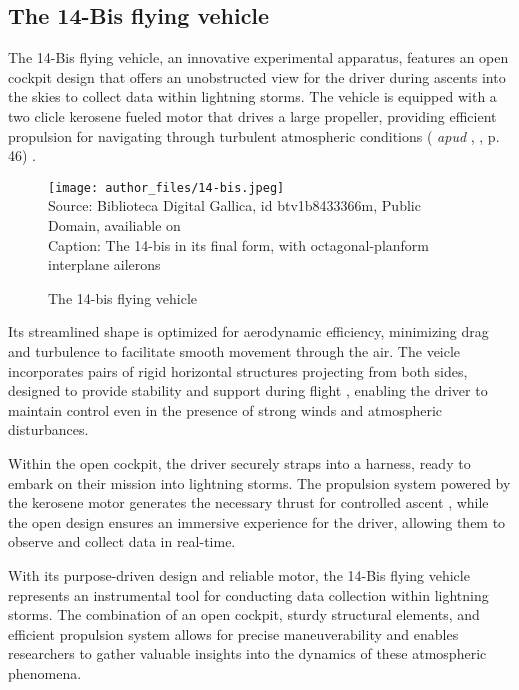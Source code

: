 \documentclass[english]{cenarticle} %
\newcommand{\citeapud}[3]{
  (\citeauthor{#1} {\it apud} \citeauthor{#2}, \citeyear{#2}, p. #3)
}
\begin{document}
\subsection{The 14-Bis flying vehicle}
The 14-Bis flying vehicle, an innovative experimental apparatus, features an open cockpit design that offers an unobstructed view for the driver during ascents into the skies to collect data within lightning storms. The vehicle is equipped with a two clicle kerosene fueled motor \citep{Torrens1992} that drives a large propeller, providing efficient propulsion for navigating through turbulent atmospheric conditions \citeapud{Pimenta1987}{Torrens1992}{46}.\par
%
\begin{figure}[!h]
  \caption{The 14-bis flying vehicle}
  \texttt{[image: author\_files/14-bis.jpeg]}\\
  {\footnotesize
    Source: Biblioteca Digital Gallica, id btv1b8433366m, Public Domain, availiable on \citep{Beau1907}\\
    Caption: The 14-bis in its final form, with octagonal-planform interplane ailerons
  }
  \label{fig:flying_veicle}
\end{figure}
%
Its streamlined shape is optimized for aerodynamic efficiency, minimizing drag and turbulence to facilitate smooth movement through the air. The veicle incorporates pairs of rigid horizontal structures projecting from both sides, designed to provide stability and support during flight \citep{Wipo}, enabling the driver to maintain control even in the presence of strong winds and atmospheric disturbances.\par
%
Within the open cockpit, the driver securely straps into a harness, ready to embark on their mission into lightning storms. The propulsion system powered by the kerosene motor generates the necessary thrust for controlled ascent \citep{Torrens1992}, while the open design ensures an immersive experience for the driver, allowing them to observe and collect data in real-time.\par
%
With its purpose-driven design and reliable motor, the 14-Bis flying vehicle represents an instrumental tool for conducting data collection within lightning storms. The combination of an open cockpit, sturdy structural elements, and efficient propulsion system allows for precise maneuverability and enables researchers to gather valuable insights into the dynamics of these atmospheric phenomena.
%
\end{document}
